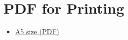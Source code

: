 \chapter{PDF for Printing}

\begin{itemize}
\tightlist
\item
  \href{/pdf/ticivara-english.pdf}{A5 size (PDF)}
\end{itemize}



